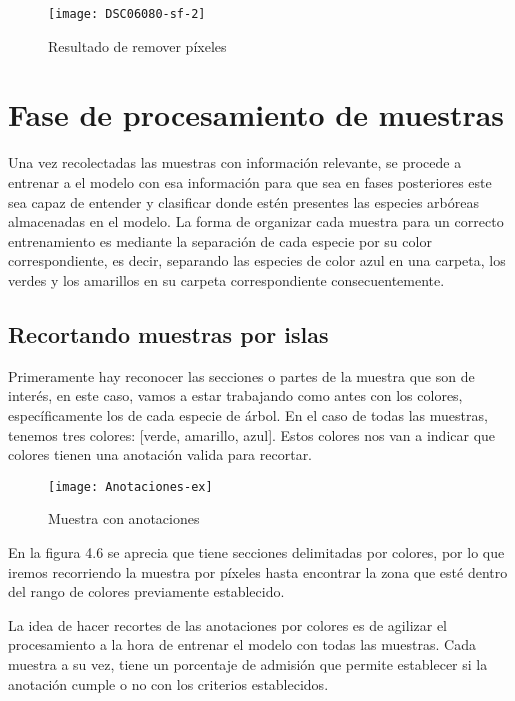 \begin{figure} [!h]
	\centering
	\begin{minipage}[b]{0.65\textwidth}
		\texttt{[image: DSC06080-sf-2]}
		\caption{Resultado de remover píxeles}
	\end{minipage}
\end{figure}

\break

\section{Fase de procesamiento de muestras}
Una vez recolectadas las muestras con información relevante, se procede a  entrenar a el modelo con esa información para que sea en fases posteriores este sea capaz de entender y clasificar donde estén presentes las especies arbóreas almacenadas en el modelo. La forma de organizar cada muestra para un correcto entrenamiento es mediante la separación de cada especie por su color correspondiente, es decir, separando las especies de color azul en una carpeta, los verdes y los amarillos en su carpeta correspondiente consecuentemente.

\subsection{Recortando muestras por islas}
Primeramente hay reconocer las secciones o partes de la muestra que son de interés, en este caso, vamos a estar trabajando como antes con los colores, específicamente los de cada especie de árbol. En el caso de todas las muestras, tenemos tres colores: [verde, amarillo, azul]. Estos colores nos van a indicar que colores tienen una anotación valida para recortar.


\begin{figure}[H]
  \centering
  \begin{minipage}[b]{0.65\textwidth}
        \texttt{[image: Anotaciones-ex]}
    \caption{Muestra con anotaciones}
  \end{minipage}
\end{figure}
\newpage

En la figura 4.6 se aprecia que tiene secciones delimitadas por colores, por lo que iremos recorriendo la muestra por píxeles hasta encontrar la zona que esté dentro del rango de colores previamente establecido.

La idea de hacer recortes de las anotaciones por colores es de agilizar el procesamiento a la hora de entrenar el modelo con todas las muestras. Cada muestra a su vez, tiene un porcentaje de admisión que permite establecer si la anotación cumple o no con los criterios establecidos.

